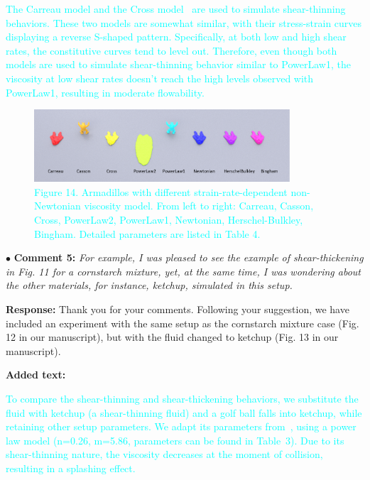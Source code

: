 \documentclass[12pt,a4paper]{article}
\newcommand{\revised}[1]{\textcolor{cyan}{#1}}
\begin{document}
\revised{The Carreau model and the Cross model~\cite{Cross1965} are used to simulate shear-thinning behaviors. These two models are somewhat similar, with their stress-strain curves displaying a reverse S-shaped pattern. Specifically, at both low and high shear rates, the constitutive curves tend to level out. Therefore, even though both models are used to simulate shear-thinning behavior similar to PowerLaw1, the viscosity at low shear rates doesn't reach the high levels observed with PowerLaw1, resulting in moderate flowability.}


\begin{figure}[htbp]
	\centering
	\includegraphics[width=0.85\textwidth]{pics/ramp.png}
	\captionsetup{labelformat=empty}
	\caption{\revised{Figure 14. Armadillos with different strain-rate-dependent non-Newtonian viscosity model. From left to right: Carreau, Casson, Cross, PowerLaw2, PowerLaw1, Newtonian, Herschel-Bulkley, Bingham. Detailed parameters are listed in Table 4.}}
\end{figure}




\vspace{0.4cm}
\noindent$\bullet$ \enspace \textbf{Comment 5:}
\textit{For example, I was pleased to see the example of shear-thickening in Fig. 11 for a cornstarch mixture, yet, at the same time, I was wondering about the other materials, for instance, ketchup, simulated in this setup. }


\vspace{0.2cm}
\textbf{Response:}
Thank you for your comments. Following your suggestion, we have included an experiment with the same setup as the cornstarch mixture case (Fig. 12 in our manuscript), but with the fluid changed to ketchup (Fig. 13 in our manuscript). 


\vspace{0.2cm}
\textbf{Added text:}

\revised{ To compare the shear-thinning and shear-thickening behaviors, we substitute the fluid with ketchup (a shear-thinning fluid) and a golf ball falls into ketchup, while retaining other setup parameters. We adapt its parameters from~\cite{Bottiglieri1991}, using a power law model (n=0.26, m=5.86, parameters can be found in Table~3). Due to its shear-thinning nature, the viscosity decreases at the moment of collision, resulting in a splashing effect.}
\end{document}
